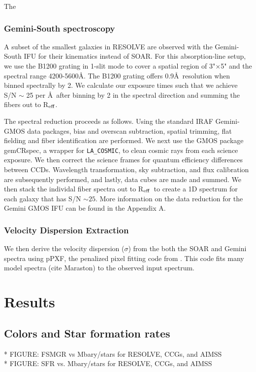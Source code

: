 \documentclass[iop,apj,twocolappendix]{emulateapj}
\newcommand{\Reff}{R$_{\rm eff}$}
\begin{document}
The 

\subsubsection{Gemini-South spectroscopy}

\noindent A subset of the smallest galaxies in RESOLVE are observed with the Gemini-South IFU for their kinematics instead of SOAR. For this absorption-line setup, we use the B1200 grating in 1-slit mode to cover a spatial region of 3"$\times$5" and the spectral range 4200-5600\AA. The B1200 grating offers 0.9\AA\ resolution when binned spectrally by 2. We calculate our exposure times such that we achieve S/N $\sim$ 25 per \AA\,  after binning by 2 in the spectral direction and summing the fibers out to \Reff.

The spectral reduction proceeds as follows. Using the standard IRAF Gemini-GMOS data packages, bias and overscan subtraction, spatial trimming, flat fielding and fiber identification are performed. We next use the GMOS package gemCRspec, a wrapper for \texttt{LA\_COSMIC}, to clean cosmic rays from each science exposure. We then correct the science frames for quantum efficiency differences between CCDs. Wavelength transformation, sky subtraction, and flux calibration are subsequently performed, and lastly, data cubes are made and summed. We then stack the individal fiber spectra out to \Reff\ to create a 1D spectrum for each galaxy that has S/N $\sim25$. More information on the data reduction for the Gemini GMOS IFU can be found in the Appendix A.

\subsubsection{Velocity Dispersion Extraction}

\noindent We then derive the velocity dispersion ($\sigma$) from the both the SOAR and Gemini spectra using {\sc pPXF}, the penalized pixel fitting code from \citet{Cappellari2004}. This code fits many model spectra (cite Maraston) to the observed input spectrum.  

\section{Results}

\subsection{Colors and Star formation rates}
\noindent 
* FIGURE: FSMGR vs Mbary/stars for RESOLVE, CCGs, and AIMSS \\
* FIGURE: SFR vs. Mbary/stars for RESOLVE, CCGs, and AIMSS \\
\end{document}
